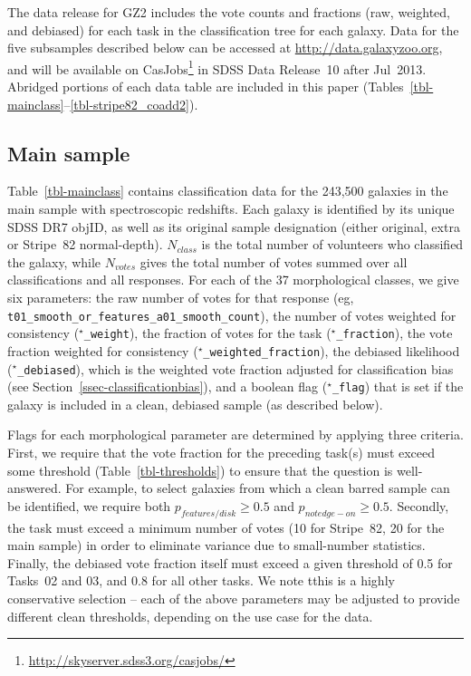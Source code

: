 \documentclass[useAMS,usenatbib]{mn2e}
\begin{document}
The data release for GZ2 includes the vote counts and fractions (raw, weighted, and debiased) for each task in the classification tree for each galaxy. Data for the five subsamples described below can be accessed at \url{http://data.galaxyzoo.org}, and will be available on CasJobs\footnote{\url{http://skyserver.sdss3.org/casjobs/}} in SDSS Data Release~10 after Jul~2013. Abridged portions of each data table are included in this paper (Tables~\ref{tbl-mainclass}--\ref{tbl-stripe82_coadd2}).

\subsection{Main sample}\label{ssec-catalogue_main}

Table~\ref{tbl-mainclass} contains classification data for the 243,500 galaxies in the main sample with spectroscopic redshifts. Each galaxy is identified by its unique SDSS DR7 objID, as well as its original sample designation (either original, extra or Stripe~82 normal-depth). $N_{class}$ is the total number of volunteers who classified the galaxy, while $N_{votes}$ gives the total number of votes summed over all classifications and all responses. For each of the 37 morphological classes, we give six parameters: the raw number of votes for that response (eg, {\tt t01\_smooth\_or\_features\_a01\_smooth\_count}), the number of votes weighted for consistency ({\tt $^\star$\_weight}), the fraction of votes for the task ({\tt $^\star$\_fraction}), the vote fraction weighted for consistency ({\tt $^\star$\_weighted\_fraction}), the debiased likelihood ({\tt $^\star$\_debiased}), which is the weighted vote fraction adjusted for classification bias (see Section~\ref{ssec-classificationbias}), and a boolean flag ({\tt $^\star$\_flag}) that is set if the galaxy is included in a clean, debiased sample (as described below).

Flags for each morphological parameter are determined by applying three criteria. First, we require that the vote fraction for the preceding task(s) must exceed some threshold (Table~\ref{tbl-thresholds}) to ensure that the question is well-answered. For example, to select galaxies from which a clean barred sample can be identified, we require both $p_{features/disk}\geq0.5$ and $p_{not edge-on}\geq0.5$. Secondly, the task must exceed a minimum number of votes (10 for Stripe~82, 20 for the main sample) in order to eliminate variance due to small-number statistics. Finally, the debiased vote fraction itself must exceed a given threshold of 0.5 for Tasks~02 and 03, and 0.8 for all other tasks. We note tthis is a highly conservative selection -- each of the above parameters may be adjusted to provide different clean thresholds, depending on the use case for the data.%
\end{document}
